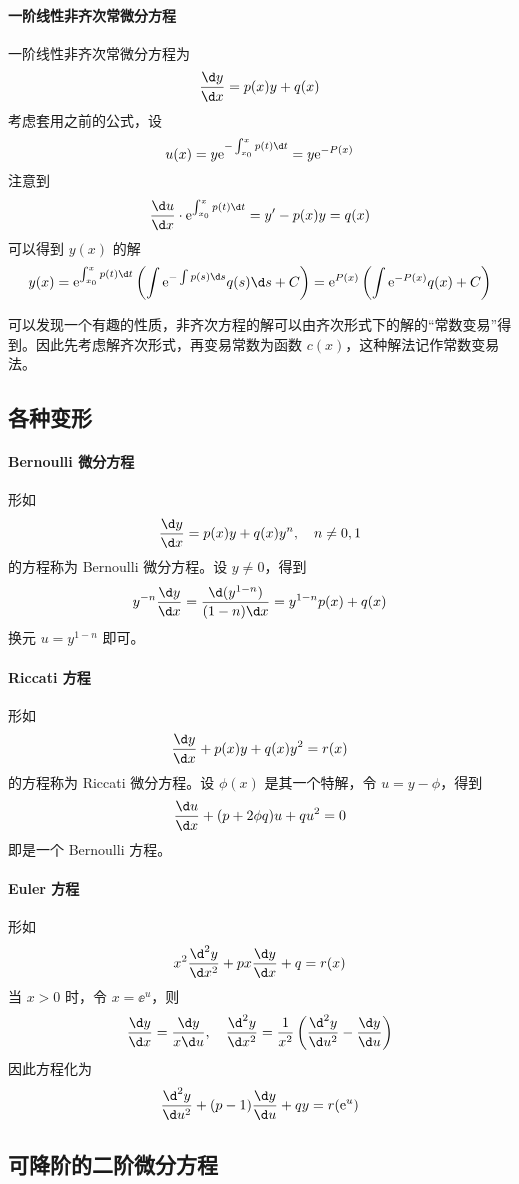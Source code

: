\paragraph{一阶线性非齐次常微分方程} 一阶线性非齐次常微分方程为
\[ \frac{\d y}{\d x} = p(x) y + q(x) \]
考虑套用之前的公式，设
\[ u(x) = y \ee^{-\int_{x_0}^{x} p(t) \d t} = y \ee^{-P(x)} \]
注意到
\[ \frac{\d u}{\d x} \cdot \ee^{\int_{x_0}^{x} p(t) \d t} = y' - p(x) y = q(x) \]
可以得到 $y(x)$ 的解
\[ y(x) = \ee^{\int_{x_0}^{x} p(t) \d t} \left(  \int \ee^{-\int p(s) \d s} q(s) \d s + C \right)
	= \ee^{P(x)} \left( \int \ee^{-P(x)} q(x) + C \right)  \]

可以发现一个有趣的性质，非齐次方程的解可以由齐次形式下的解的“常数变易”得到。因此先考虑解齐次形式，再变易常数为函数 $c(x)$，这种解法记作常数变易法。

\subsection{各种变形}

\paragraph{Bernoulli 微分方程} 形如
\[ \frac{\d y}{\d x} = p(x) y + q(x) y^n, \quad n \neq 0,1 \]
的方程称为 Bernoulli 微分方程。设 $y \neq 0$，得到
\[ y^{-n} \frac{\d y}{\d x} = \frac{\d (y^{1-n})}{(1-n)\d x} = y^{1-n}p(x) + q(x) \]
换元 $u = y^{1-n}$ 即可。

\paragraph{Riccati 方程}
形如
\[ \frac{\d y}{\d x} + p(x) y + q(x)y^2 = r(x) \]
的方程称为 Riccati 微分方程。设 $\phi(x)$ 是其一个特解，令 $u = y - \phi$，得到
\[ \frac{\d u}{\d x} + (p + 2 \phi q) u + q u^2 = 0 \]
即是一个 Bernoulli 方程。

\paragraph{Euler 方程}
形如
\[ x^2 \frac{\d^2 y}{\d x^2} + p x \frac{\d y}{\d x} + q = r(x) \]
当 $x > 0$ 时，令 $x = \ee^u$，则
\[ \frac{\d y}{\d x} = \frac{\d y}{x \d u}, \quad \frac{\d^2 y}{\d x^2} = \frac{1}{x^2} \left( \frac{\d^2 y}{\d u^2} - \frac{\d y}{\d u} \right) \]
因此方程化为
\[ \frac{\d^2 y}{\d u^2} + (p-1) \frac{\d y}{\d u} + qy = r(\ee^u) \]

\subsection{可降阶的二阶微分方程}

